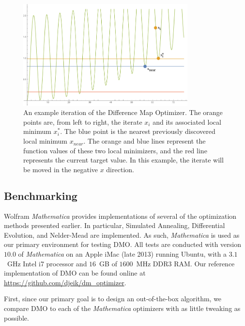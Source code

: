 \documentclass[12pt]{article}
\begin{document}
\begin{figure}[H]
    \begin{center}
        \includegraphics[width=0.8\textwidth]{../figures/iteratingnew.png}
        \caption{An example iteration of the Difference Map Optimizer.
            The orange points are, from left to right, the iterate $x_i$
            and its associated local minimum $x_i^*$. The blue point is the
            nearest previously discovered local minimum $x_{near}$.
            The orange and blue lines represent the function values of
            these two local minimizers, and the red line represents the
            current target value. In this example, the iterate will be
            moved in the negative $x$ direction.}
        \label{fig:iteration}
    \end{center}
\end{figure}


\subsection{Benchmarking}

Wolfram \emph{Mathematica} provides implementations of several of the
optimization methods presented earlier.
In particular, Simulated Annealing, Differential Evolution, and Nelder-Mead
are implemented.
As such, \emph{Mathematica} is used as our primary environment for testing
DMO.
All tests are conducted with version $10.0$ of \emph{Mathematica} on an
Apple iMac (late 2013) running Ubuntu, with a $3.1$~GHz Intel i7 processor
and $16$~GB of $1600$~MHz DDR3 RAM.
Our reference implementation of DMO can be found online at
\url{https://github.com/djeik/dm_optimizer}.

First, since our primary goal is to design an out-of-the-box algorithm,
we compare DMO to each of the \emph{Mathematica} optimizers with as little
tweaking as possible.
\end{document}
